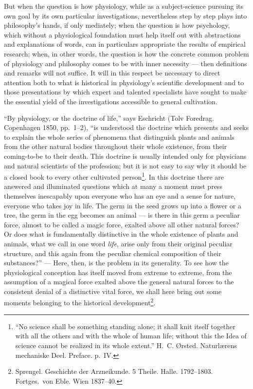 \documentclass[12pt,a4paper]{book}
\begin{document}
But when the question is how physiology, while as a subject-science pursuing
its own goal by its own particular investigations, nevertheless step by step
plays into philosophy's hands, if only mediately; when the question is how
psychology, which without a physiological foundation must help itself out with
abstractions and explanations of words, can in particulars appropriate the
results of empirical research; when, in other words, the question is how the
concrete common problem of physiology and philosophy comes to be with inner
necessity --- then definitions and remarks will not suffice. It will in this
respect be necessary to direct attention both to what is historical in
physiology's scientific development and to those presentations by which expert
and talented specialists have sought to make the essential yield of the
investigations accessible to general cultivation.

\setcounter{footnote}{0}
``By physiology, or the doctrine of life,'' says Eschricht (Tolv Foredrag.
Copenhagen 1850, pp.~1--2), ``is understood the doctrine which presents and
seeks to explain the whole series of phenomena that distinguish plants and
animals from the other natural bodies throughout their whole existence, from
their coming-to-be to their death. This doctrine is usually intended only for
physicians and natural scientists of the profession; but it is not easy to say
why it should be a closed book to every other cultivated person\footnote{``No
science shall be something standing alone; it shall knit itself together with
all the others and with the whole of human life; without this the Idea of
science cannot be realized in its whole extent.'' H.~C. Ørsted. Naturlærens
mechaniske Deel. Preface. p.~IV.}. In this doctrine there are
answered and illuminated questions which at many a moment must press themselves
inescapably upon everyone who has an eye and a sense for nature, everyone who
takes joy in life. The germ in the seed grows up into a flower or a tree, the
germ in the egg becomes an animal --- is there in this germ a peculiar force,
almost to be called a magic force, exalted above all other natural forces? Or
does what is fundamentally distinctive in the whole existence of plants and
animals, what we call in one word \emph{life}, arise only from their original
peculiar structure, and this again from the peculiar chemical composition of
their substances?'' --- Here, then, is the problem in its generality. To see
how the physiological conception has itself moved from extreme to extreme, from
the assumption of a magical force exalted above the general natural forces to
the consistent denial of a distinctive vital force, we shall here bring out
some moments belonging to the historical
development\footnote{Sprengel. Geschichte der Arzneikunde. 5 Theile. Halle.
1792--1803. Fortges.\ von Eble. Wien 1837--40.}.
\end{document}
